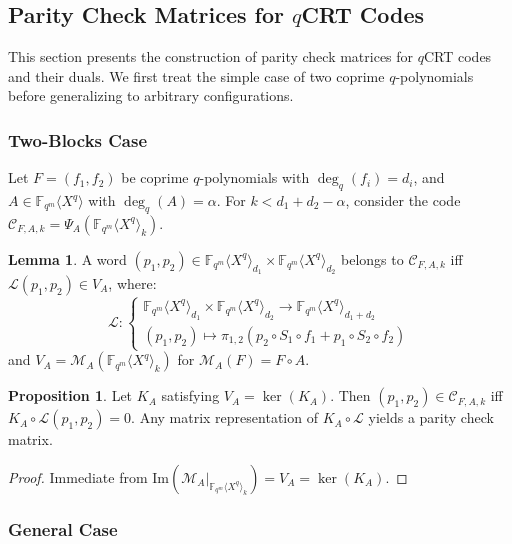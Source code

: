 \documentclass{article}
\newcommand{\QP}{\mathbb{F}_{q^m} \langle X^q \rangle}
\theoremstyle{definition}
\newtheorem{proposition}[theorem]{Proposition}
\newtheorem{lemma}[theorem]{Lemma}
\begin{document}
\subsection{Parity Check Matrices for $q$CRT Codes}
\label{sec:parity}

This section presents the construction of parity check matrices for $q$CRT codes and their duals. We first treat the simple case of two coprime $q$-polynomials before generalizing to arbitrary configurations.

\subsubsection{Two-Blocks Case}
\label{example}

Let $F = (f_1, f_2)$ be coprime $q$-polynomials with $\deg_q(f_i) = d_i$, and $A \in \mathbb{F}_{q^m}\langle X^q \rangle$ with $\deg_q(A) = \alpha$. For $k < d_1 + d_2 - \alpha$, consider the code $\mathcal{C}_{F,A,k} = \Psi_A(\QP_k)$.

\begin{lemma}
      A word $(p_1,p_2) \in \QP_{d_1} \times \QP_{d_2}$ belongs to $\mathcal{C}_{F,A,k}$ iff $\mathcal{L}(p_1,p_2) \in V_A$, where:
      \[
            \mathcal{L} :
            \begin{cases}
                  \QP_{d_1} \times \QP_{d_2} \to \QP_{d_1+d_2} \\
                  (p_1,p_2) \mapsto \pi_{1,2}(p_2 \circ S_1 \circ f_1 + p_1 \circ S_2 \circ f_2)
            \end{cases}
      \]
      and $V_A = \mathcal{M}_A(\QP_k)$ for $\mathcal{M}_A(F) = F \circ A$.
\end{lemma}

\begin{proposition}
      \label{prop:parity2}
      Let $K_A$ satisfying $V_A = \ker(K_A)$. Then $(p_1,p_2) \in \mathcal{C}_{F,A,k}$ iff $K_A \circ \mathcal{L}(p_1,p_2) = 0$. Any matrix representation of $K_A \circ \mathcal{L}$ yields a parity check matrix.
\end{proposition}

\begin{proof}
      Immediate from $\mathrm{Im}(\mathcal{M}_A|_{\QP_k}) = V_A = \ker(K_A)$.
\end{proof}

\subsubsection{General Case}
\label{general}
\end{document}
